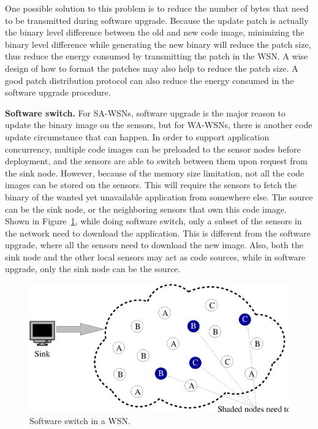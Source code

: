 One possible solution to this problem is to reduce the number of bytes that need to be transmitted during software upgrade. Because the update patch is actually the binary level difference between the old and new code image, minimizing the binary level difference while generating the new binary will reduce the patch size, thus reduce the energy consumed by transmitting the patch in the WSN. A wise design of how to format the patches may also help to reduce the patch size.
A good patch distribution protocol can also reduce the energy consumed in the software upgrade procedure.


\textbf{Software switch.}
For SA-WSNs, software upgrade is the major reason to update the binary image on the sensors, but for WA-WSNs, there is another code update circumstance that can happen.
In order to support application concurrency, multiple code images can be preloaded to the sensor nodes before deployment, and the sensors are able to switch between them upon request from the sink node. However, because of the memory size limitation, not all the code images can be stored on the sensors. This will require the sensors to fetch the binary of the wanted yet unavailable application from somewhere else. The source can be the sink node, or the neighboring sensors that own this code image. Shown in Figure~\ref{fig:switch}, while doing software switch, only a subset of the sensors in the network need to download the application.
This is different from the software upgrade, where all the sensors need to download the new image. Also, both the sink node and the other local sensors may act as code sources, while in software upgrade, only the sink node can be the source.
\begin{figure}[htbp]
	\centering
		\includegraphics[scale=0.45]{figures/switch.eps}
	\caption{Software switch in a WSN.}
	\label{fig:switch}
\end{figure}


